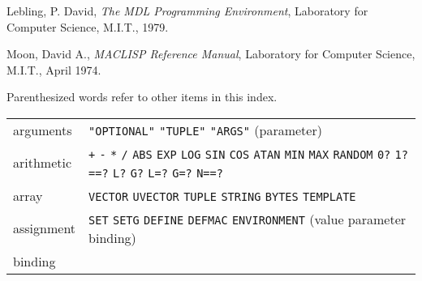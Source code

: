 \documentclass[a4paper]{scrbook}
\begin{document}
Lebling, P. David, \emph{The MDL Programming Environment}, Laboratory for Computer Science, M.I.T., 1979.

Moon, David A., \emph{MACLISP Reference Manual}, Laboratory for Computer Science, M.I.T., April 1974.

\label{topic-index}

Parenthesized words refer to other items in this index.

\begin{longtable}[]{@{}ll@{}}
\toprule
\begin{minipage}[t]{0.11\columnwidth}\raggedright\strut
arguments\strut
\end{minipage} & \begin{minipage}[t]{0.83\columnwidth}\raggedright\strut
\texttt{"OPTIONAL"} \texttt{"TUPLE"} \texttt{"ARGS"} (parameter)\strut
\end{minipage}\tabularnewline
\begin{minipage}[t]{0.11\columnwidth}\raggedright\strut
arithmetic\strut
\end{minipage} & \begin{minipage}[t]{0.83\columnwidth}\raggedright\strut
\texttt{+} \texttt{-} \texttt{*} \texttt{/} \texttt{ABS} \texttt{EXP} \texttt{LOG} \texttt{SIN} \texttt{COS} \texttt{ATAN}
\texttt{MIN} \texttt{MAX} \texttt{RANDOM} \texttt{0?} \texttt{1?} \texttt{==?} \texttt{L?} \texttt{G?} \texttt{L=?}
\texttt{G=?} \texttt{N==?}\strut
\end{minipage}\tabularnewline
\begin{minipage}[t]{0.11\columnwidth}\raggedright\strut
array\strut
\end{minipage} & \begin{minipage}[t]{0.83\columnwidth}\raggedright\strut
\texttt{VECTOR} \texttt{UVECTOR} \texttt{TUPLE} \texttt{STRING} \texttt{BYTES} \texttt{TEMPLATE}\strut
\end{minipage}\tabularnewline
\begin{minipage}[t]{0.11\columnwidth}\raggedright\strut
assignment\strut
\end{minipage} & \begin{minipage}[t]{0.83\columnwidth}\raggedright\strut
\texttt{SET} \texttt{SETG} \texttt{DEFINE} \texttt{DEFMAC} \texttt{ENVIRONMENT} (value parameter binding)\strut
\end{minipage}\tabularnewline
\begin{minipage}[t]{0.11\columnwidth}\raggedright\strut
binding\strut
\end{minipage} & \begin{minipage}[t]{0.83\columnwidth}\raggedright\strut

\end{minipage}
\end{longtable}
\end{document}
